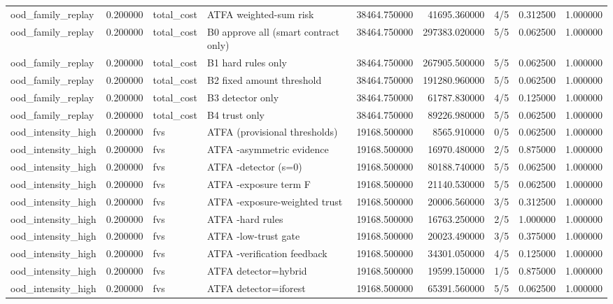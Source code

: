 \begin{tabular}{lrllrrlrr}
ood\_family\_replay & 0.200000 & total\_cost & ATFA weighted-sum risk & 38464.750000 & 41695.360000 & 4/5 & 0.312500 & 1.000000 \\
ood\_family\_replay & 0.200000 & total\_cost & B0 approve all (smart contract only) & 38464.750000 & 297383.020000 & 5/5 & 0.062500 & 1.000000 \\
ood\_family\_replay & 0.200000 & total\_cost & B1 hard rules only & 38464.750000 & 267905.500000 & 5/5 & 0.062500 & 1.000000 \\
ood\_family\_replay & 0.200000 & total\_cost & B2 fixed amount threshold & 38464.750000 & 191280.960000 & 5/5 & 0.062500 & 1.000000 \\
ood\_family\_replay & 0.200000 & total\_cost & B3 detector only & 38464.750000 & 61787.830000 & 4/5 & 0.125000 & 1.000000 \\
ood\_family\_replay & 0.200000 & total\_cost & B4 trust only & 38464.750000 & 89226.980000 & 5/5 & 0.062500 & 1.000000 \\
ood\_intensity\_high & 0.200000 & fvs & ATFA (provisional thresholds) & 19168.500000 & 8565.910000 & 0/5 & 0.062500 & 1.000000 \\
ood\_intensity\_high & 0.200000 & fvs & ATFA -asymmetric evidence & 19168.500000 & 16970.480000 & 2/5 & 0.875000 & 1.000000 \\
ood\_intensity\_high & 0.200000 & fvs & ATFA -detector (s=0) & 19168.500000 & 80188.740000 & 5/5 & 0.062500 & 1.000000 \\
ood\_intensity\_high & 0.200000 & fvs & ATFA -exposure term F & 19168.500000 & 21140.530000 & 5/5 & 0.062500 & 1.000000 \\
ood\_intensity\_high & 0.200000 & fvs & ATFA -exposure-weighted trust & 19168.500000 & 20006.560000 & 3/5 & 0.312500 & 1.000000 \\
ood\_intensity\_high & 0.200000 & fvs & ATFA -hard rules & 19168.500000 & 16763.250000 & 2/5 & 1.000000 & 1.000000 \\
ood\_intensity\_high & 0.200000 & fvs & ATFA -low-trust gate & 19168.500000 & 20023.490000 & 3/5 & 0.375000 & 1.000000 \\
ood\_intensity\_high & 0.200000 & fvs & ATFA -verification feedback & 19168.500000 & 34301.050000 & 4/5 & 0.125000 & 1.000000 \\
ood\_intensity\_high & 0.200000 & fvs & ATFA detector=hybrid & 19168.500000 & 19599.150000 & 1/5 & 0.875000 & 1.000000 \\
ood\_intensity\_high & 0.200000 & fvs & ATFA detector=iforest & 19168.500000 & 65391.560000 & 5/5 & 0.062500 & 1.000000 \\

\end{tabular}
